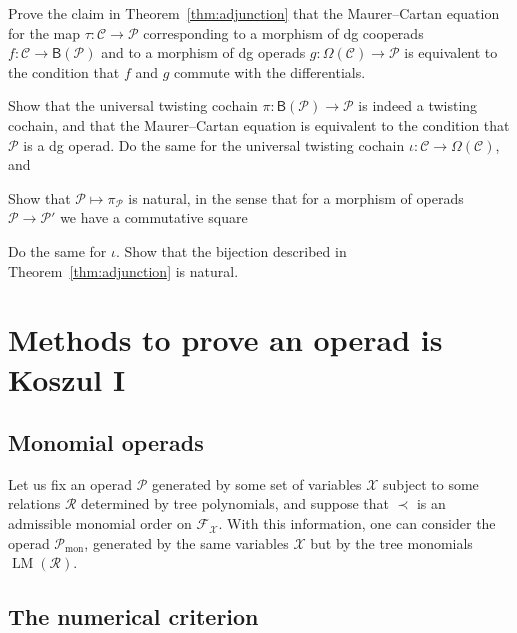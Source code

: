 \documentclass[fleqn, a4paper, twoside]{article}
\makeatletter
\newcommand{\leadm}[1]{\operatorname{LM}(#1)}
\newcommand{\0}{\langle 0\rangle}
\newcommand{\XX}{\mathcal{X}}
\newcommand{\RR}{\mathcal{R}}
\newcommand{\FF}{\mathcal{F}}
\newcommand{\B}[1]{\mathsf{B}(#1)}
\let\[\@undefined
\DeclareRobustCommand{\[}{\begin{equation}}%
\let\]\@undefined
\DeclareRobustCommand{\]}{\end{equation}}%
\theoremstyle{mytheorem}
\theoremstyle{introthm}
\theoremstyle{mydefinition}
\theoremstyle{mydefinition2}
\theoremstyle{plain} %
\newcommand{\CC}{\mathcal{C}}
\newcommand{\?}{\,?\,}
\newcommand{\PP}{{\mathcal{P}}}
\theoremstyle{mytheorem}
\theoremstyle{plain} %
\newcommand\blankpage{%
    \null
    \thispagestyle{empty}%
    \newpage}
\makeatother
\begin{document}
\begin{question}
Prove the claim in Theorem~\ref{thm:adjunction} that the Maurer--Cartan
equation for the map $\tau : \CC\longrightarrow \PP$ corresponding
to a morphism of dg cooperads $f : \CC\longrightarrow \B{\PP}$
and to a morphism of dg operads $g  :\Omega(\CC) \longrightarrow \PP$
is equivalent to the condition that $f$ and $g$ commute with the
differentials.
\end{question}


\begin{question}\label{ex:universaltw}
Show that the universal twisting cochain
$\pi:\B{\PP}\longrightarrow \PP$ is indeed
a twisting cochain, and that the Maurer--Cartan
equation is equivalent to the condition that 
$\PP$ is a dg operad. Do the same for the 
 universal twisting cochain $\iota : \CC 
\longrightarrow \Omega(\CC)$, and 
\end{question}


\begin{question}
Show that $\PP \longmapsto \pi_\PP$ is natural, in
the sense that for a morphism of operads $\PP\longrightarrow 
\PP'$ we have a commutative square
\[
\]
Do the same for $\iota$. Show that the bijection described in Theorem~\ref{thm:adjunction} 
is natural.  
\end{question}

\afterpage{\blankpage}
\newpage

\section{Methods to prove an operad is Koszul I}

 \subsection{Monomial operads}
 
Let us fix an operad $\PP$ generated by some set of
variables $\XX$ subject to some relations $\RR$ determined
by tree polynomials, and suppose that $\prec$ is an admissible
monomial order on $\FF_\XX$. With this information, one
can consider the operad $\PP_\mathrm{mon}$, generated by
the same variables $\XX$ but by the tree monomials 
$\leadm{\RR}$.
 
\subsection{The numerical criterion}
\end{document}

